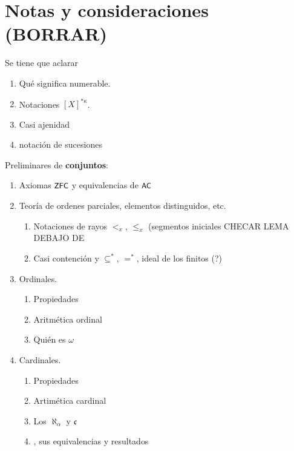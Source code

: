 \chapter*{Notas y consideraciones (BORRAR)}

        \begin{flushright}
            Se tiene que aclarar
        \end{flushright}

        \begin{enumerate}
            \item Qué significa numerable.
            \item Notaciones $[X]^{* \kappa}$.
            \item Casi ajenidad
            \item notación de sucesiones
        \end{enumerate}
        
        \begin{flushright}
            Preliminares de \textbf{conjuntos}:
        \end{flushright}
        \begin{enumerate}
            \item Axiomas $\text{\textsf{\small ZFC}}$ y equivalencias de $\text{\textsf{\small AC}}$
            \item Teoría de ordenes parciales, elementos distinguidos, etc.
                \begin{enumerate}
                    \item Notaciones de rayos $<_x$, $\leq_x$ (segmentos iniciales CHECAR LEMA DEBAJO DE 
                    \item Casi contención y $\subseteq^*$, $=^*$, ideal de los finitos (?)
                \end{enumerate}
            \item Ordinales.
            \begin{enumerate}
                \item Propiedades
                \item Aritmética ordinal
                \item Quién es $\omega$
            \end{enumerate}
            \item Cardinales.
            \begin{enumerate}
                \item Propiedades
                \item Artimética cardinal
                \item Los $\aleph_\alpha$ y $\mathfrak{c}$
                \item \HC, sus equivalencias y resultados
            \end{enumerate}
        \end{enumerate}
        
